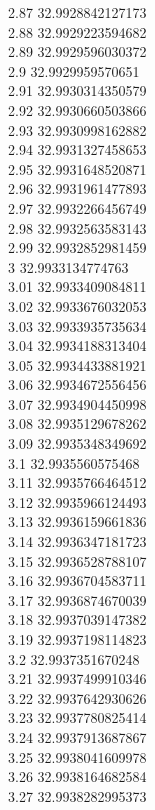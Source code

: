 {2.87	32.9928842127173\\
2.88	32.9929223594682\\
2.89	32.9929596030372\\
2.9	32.9929959570651\\
2.91	32.9930314350579\\
2.92	32.9930660503866\\
2.93	32.9930998162882\\
2.94	32.9931327458653\\
2.95	32.9931648520871\\
2.96	32.9931961477893\\
2.97	32.9932266456749\\
2.98	32.9932563583143\\
2.99	32.9932852981459\\
3	32.9933134774763\\
3.01	32.9933409084811\\
3.02	32.9933676032053\\
3.03	32.9933935735634\\
3.04	32.9934188313404\\
3.05	32.9934433881921\\
3.06	32.9934672556456\\
3.07	32.9934904450998\\
3.08	32.9935129678262\\
3.09	32.9935348349692\\
3.1	32.9935560575468\\
3.11	32.9935766464512\\
3.12	32.9935966124493\\
3.13	32.9936159661836\\
3.14	32.9936347181723\\
3.15	32.9936528788107\\
3.16	32.9936704583711\\
3.17	32.9936874670039\\
3.18	32.9937039147382\\
3.19	32.9937198114823\\
3.2	32.9937351670248\\
3.21	32.9937499910346\\
3.22	32.9937642930626\\
3.23	32.9937780825414\\
3.24	32.9937913687867\\
3.25	32.9938041609978\\
3.26	32.9938164682584\\
3.27	32.9938282995373\\
}
